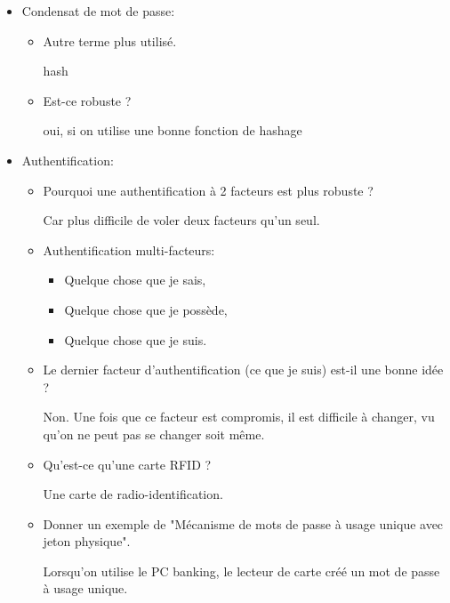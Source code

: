 \documentclass[a4paper]{article}
\begin{document}
\begin{itemize}
\item Condensat de mot de passe:
\begin{itemize}
    \item Autre terme plus utilisé.
    \begin{example}
        hash
    \end{example}
    \item Est-ce robuste ?
    \begin{example}
        oui, si on utilise une bonne fonction de hashage
    \end{example}
\end{itemize}





\item Authentification:
\begin{itemize}
    \item Pourquoi une authentification à 2 facteurs est plus robuste ?
    \begin{example}
        Car plus difficile de voler deux facteurs qu'un seul.
    \end{example}
    \item Authentification multi-facteurs:
    \begin{itemize}
        \item Quelque chose que je sais,
        \item Quelque chose que je possède,
        \item Quelque chose que je suis.
    \end{itemize}
    \item Le dernier facteur d'authentification (ce que je suis) est-il une bonne idée ?
    \begin{example}
        Non. Une fois que ce facteur est compromis, il est difficile à changer, vu qu'on ne peut pas se changer soit même.
    \end{example}
    \item Qu’est-ce qu’une carte RFID ?
    \begin{example}
        Une carte de radio-identification.
    \end{example}
    \item Donner un exemple de "Mécanisme de mots de passe à usage unique avec jeton physique".
    \begin{example}
        Lorsqu'on utilise le PC banking, le lecteur de carte créé un mot de passe à usage unique.
    \end{example}
\end{itemize}






\end{itemize}
\end{document}

